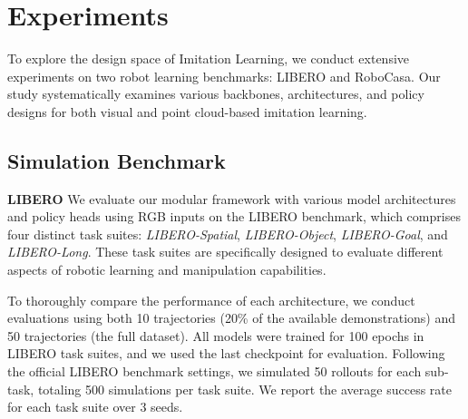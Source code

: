 \section{Experiments}
\label{sec:experiments}

To explore the design space of Imitation Learning, we conduct extensive experiments on two robot learning benchmarks: LIBERO and RoboCasa. Our study systematically examines various backbones, architectures, and policy designs for both visual and point cloud-based imitation learning.


\subsection{Simulation Benchmark}

\textbf{LIBERO} \cite{liu2023liberobenchmarkingknowledgetransfer}
We evaluate our modular framework with various model architectures and policy heads using RGB inputs on the LIBERO benchmark, which comprises four distinct task suites: \textit{LIBERO-Spatial}, \textit{LIBERO-Object}, \textit{LIBERO-Goal}, and \textit{LIBERO-Long}. These task suites are specifically designed to evaluate different aspects of robotic learning and manipulation capabilities.

To thoroughly compare the performance of each architecture, we conduct evaluations using both 10 trajectories (20\% of the available demonstrations) and 50 trajectories (the full dataset). All models were trained for 100 epochs in LIBERO task suites, and we used the last checkpoint for evaluation. Following the official LIBERO benchmark settings, we simulated 50 rollouts for each sub-task, totaling 500 simulations per task suite. We report the average success rate for each task suite over 3 seeds. 




